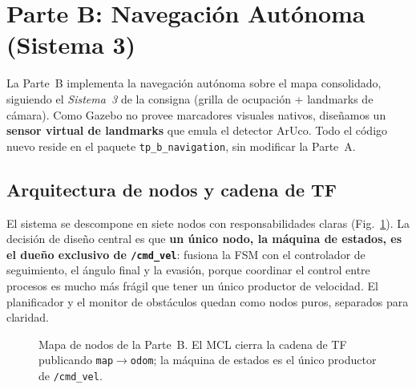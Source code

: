 \section{Parte B: Navegación Autónoma (Sistema 3)}
\label{sec:parte_b}

La Parte~B implementa la navegación autónoma sobre el mapa consolidado, siguiendo el \emph{Sistema~3} de la consigna (grilla de ocupación + landmarks de cámara). Como Gazebo no provee marcadores visuales nativos, diseñamos un \textbf{sensor virtual de landmarks} que emula el detector ArUco. Todo el código nuevo reside en el paquete \texttt{tp\_b\_navigation}, sin modificar la Parte~A.

\subsection{Arquitectura de nodos y cadena de TF}
El sistema se descompone en siete nodos con responsabilidades claras (Fig.~\ref{fig:nodos_b}). La decisión de diseño central es que \textbf{un único nodo, la máquina de estados, es el dueño exclusivo de \texttt{/cmd\_vel}}: fusiona la FSM con el controlador de seguimiento, el ángulo final y la evasión, porque coordinar el control entre procesos es mucho más frágil que tener un único productor de velocidad. El planificador y el monitor de obstáculos quedan como nodos puros, separados para claridad.

\begin{figure}[t]
\centering
{}
\caption{Mapa de nodos de la Parte~B. El MCL cierra la cadena de TF publicando \texttt{map$\to$odom}; la máquina de estados es el único productor de \texttt{/cmd\_vel}.}
\label{fig:nodos_b}
\end{figure}

